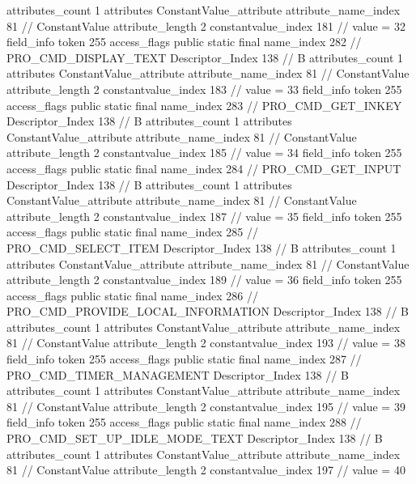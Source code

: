 {{{{{				attributes_count	1
				attributes {
				ConstantValue_attribute {
					attribute_name_index	81		// ConstantValue
					attribute_length	2
					constantvalue_index	181		// value = 32
				}
				}
			}
			field_info {
				token	255
				access_flags	public static final
				name_index	282		// PRO_CMD_DISPLAY_TEXT
				Descriptor_Index	138		// B
				attributes_count	1
				attributes {
				ConstantValue_attribute {
					attribute_name_index	81		// ConstantValue
					attribute_length	2
					constantvalue_index	183		// value = 33
				}
				}
			}
			field_info {
				token	255
				access_flags	public static final
				name_index	283		// PRO_CMD_GET_INKEY
				Descriptor_Index	138		// B
				attributes_count	1
				attributes {
				ConstantValue_attribute {
					attribute_name_index	81		// ConstantValue
					attribute_length	2
					constantvalue_index	185		// value = 34
				}
				}
			}
			field_info {
				token	255
				access_flags	public static final
				name_index	284		// PRO_CMD_GET_INPUT
				Descriptor_Index	138		// B
				attributes_count	1
				attributes {
				ConstantValue_attribute {
					attribute_name_index	81		// ConstantValue
					attribute_length	2
					constantvalue_index	187		// value = 35
				}
				}
			}
			field_info {
				token	255
				access_flags	public static final
				name_index	285		// PRO_CMD_SELECT_ITEM
				Descriptor_Index	138		// B
				attributes_count	1
				attributes {
				ConstantValue_attribute {
					attribute_name_index	81		// ConstantValue
					attribute_length	2
					constantvalue_index	189		// value = 36
				}
				}
			}
			field_info {
				token	255
				access_flags	public static final
				name_index	286		// PRO_CMD_PROVIDE_LOCAL_INFORMATION
				Descriptor_Index	138		// B
				attributes_count	1
				attributes {
				ConstantValue_attribute {
					attribute_name_index	81		// ConstantValue
					attribute_length	2
					constantvalue_index	193		// value = 38
				}
				}
			}
			field_info {
				token	255
				access_flags	public static final
				name_index	287		// PRO_CMD_TIMER_MANAGEMENT
				Descriptor_Index	138		// B
				attributes_count	1
				attributes {
				ConstantValue_attribute {
					attribute_name_index	81		// ConstantValue
					attribute_length	2
					constantvalue_index	195		// value = 39
				}
				}
			}
			field_info {
				token	255
				access_flags	public static final
				name_index	288		// PRO_CMD_SET_UP_IDLE_MODE_TEXT
				Descriptor_Index	138		// B
				attributes_count	1
				attributes {
				ConstantValue_attribute {
					attribute_name_index	81		// ConstantValue
					attribute_length	2
					constantvalue_index	197		// value = 40
}}}}}}}
